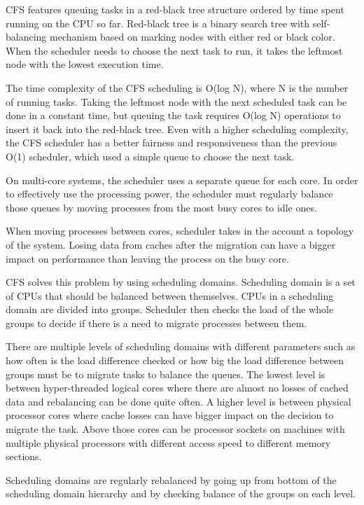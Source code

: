 CFS features queuing tasks in a red-black tree structure ordered by time spent
running on the CPU so far. Red-black tree is a binary search
tree with self-balancing mechanism based on marking nodes with either red or
black color. When the scheduler needs to choose the next task to run, it takes
the leftmost node with the lowest execution time.

The time complexity of the CFS scheduling is O(log N), where N is the number
of running tasks. Taking the leftmost node
with the next scheduled task can be done in a constant time, but queuing the task
requires O(log N) operations to insert it back into the red-black tree. Even
with a higher scheduling complexity, the CFS scheduler has a better fairness and
responsiveness than the previous O(1) scheduler, which used a simple queue to
choose the next task.

On multi-core systems, the scheduler uses a separate queue for each core. In
order to effectively use the processing power, the scheduler must regularly
balance those queues by moving processes from the most busy cores to idle ones.

When moving processes between cores, scheduler takes in the account a topology
of the system. Losing data from caches after the migration can have a bigger
impact on performance than leaving the process on the busy core.

CFS solves this problem by using scheduling domains. Scheduling domain is a set
of CPUs that should be balanced between themselves. CPUs in a scheduling domain
are divided into groups. Scheduler then checks the load of the whole groups to
decide if there is a need to migrate processes between them.

There are multiple levels of scheduling domains with different parameters such as
how often is the load difference checked or how big the load difference between
groups must be to migrate tasks to balance the queues.
The lowest level is between hyper-threaded logical cores where there are almost
no losses of cached data and rebalancing can be done quite often.
A higher level is between physical processor cores where cache losses can have
bigger impact on the decision to migrate the task.
Above those cores can be processor sockets on machines with multiple physical
processors with different access speed to different memory sections.

Scheduling domains are regularly rebalanced by going up from bottom of the
scheduling domain hierarchy and by checking balance of the groups on each level.

